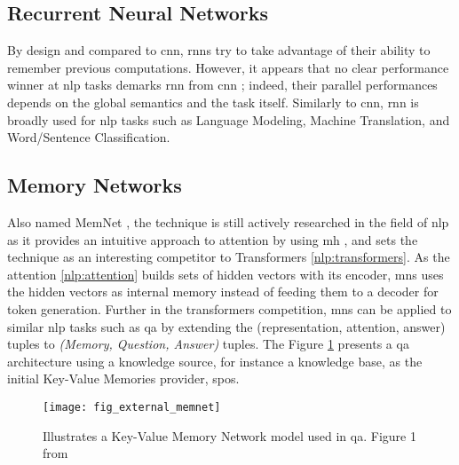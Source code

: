 \subsection{Recurrent Neural Networks}
 By design and compared to \gls{cnn}, \glspl{rnn} try to take advantage of their ability to remember previous computations. However, it appears that no clear performance winner at \gls{nlp} tasks demarks \gls{rnn} from \gls{cnn} \autocite{paper:Yin2017}; indeed, their parallel performances depends on the global semantics and the task itself. Similarly to \gls{cnn}, \gls{rnn} is broadly used for \gls{nlp} tasks such as Language Modeling, Machine Translation, and Word/Sentence Classification.

\subsection{Memory Networks}
Also named MemNet \autocite{paper:Weston2015MemoryN}, the technique is still actively researched in the field of \gls{nlp} as it provides an intuitive approach to attention by using \gls{mh} \autocite{paper:journals/corr/TangQL16}, and sets the technique as an interesting competitor to Transformers \ref{nlp:transformers}. As the \gls{attention} \ref{nlp:attention} builds sets of hidden vectors with its encoder, \glspl{mn} uses the hidden vectors as internal memory instead of feeding them to a decoder for token generation. Further in the \glspl{transformer} competition, \glspl{mn} can be applied to similar \gls{nlp} tasks such as \gls{qa} \autocite{paper:journals/corr/KumarISBEPOGS15} by extending the (representation, attention, answer) tuples to \textit{(Memory, Question, Answer)} tuples. The Figure \ref{fig:fig_external_memnet} presents a \gls{qa} architecture using a knowledge source, for instance a knowledge base, as the initial Key-Value Memories provider, \glspl{spo}. 

\begin{figure}
    \centering
    \texttt{[image: fig\_external\_memnet]}
    \caption{Illustrates a Key-Value Memory Network model used in \gls{qa}. Figure 1 from \autocite{paper:journals/corr/MillerFDKBW16}}
    \label{fig:fig_external_memnet}
\end{figure}



